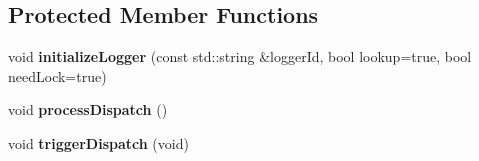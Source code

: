 \subsection*{Protected Member Functions}
\begin{DoxyCompactItemize}
\item 
void {\bfseries initialize\+Logger} (const std\+::string \&logger\+Id, bool lookup=true, bool need\+Lock=true)\hypertarget{classel_1_1base_1_1Writer_ae687ebbee62b086f318ee4c8d1a655c4}{}\label{classel_1_1base_1_1Writer_ae687ebbee62b086f318ee4c8d1a655c4}

\item 
void {\bfseries process\+Dispatch} ()\hypertarget{classel_1_1base_1_1Writer_a692d05d209840d6ae8c2c8e0bea21d29}{}\label{classel_1_1base_1_1Writer_a692d05d209840d6ae8c2c8e0bea21d29}

\item 
void {\bfseries trigger\+Dispatch} (void)\hypertarget{classel_1_1base_1_1Writer_a1c7d90bd4e00af4e7307f5936e1b6507}{}\label{classel_1_1base_1_1Writer_a1c7d90bd4e00af4e7307f5936e1b6507}

\end{DoxyCompactItemize}
